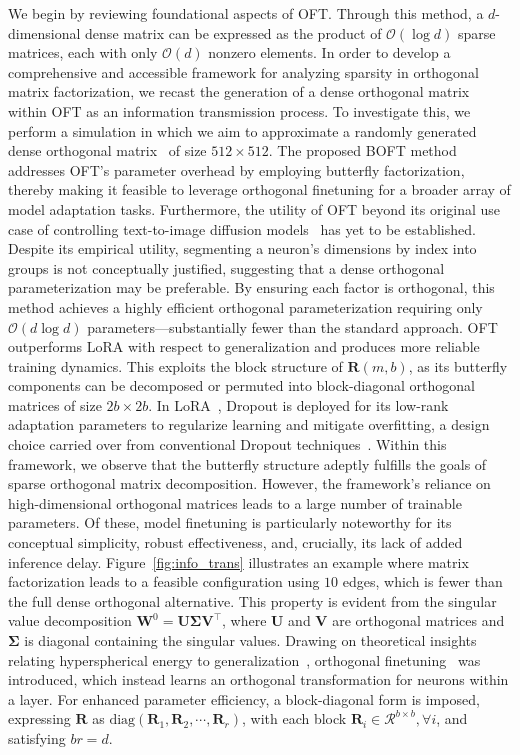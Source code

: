 \begin{itemize}[leftmargin=*,nosep]
\begin{theorem}
We begin by reviewing foundational aspects of OFT. Through this method, a $d$-dimensional dense matrix can be expressed as the product of $\mathcal{O}(\log d)$ sparse matrices, each with only $\mathcal{O}(d)$ nonzero elements. In order to develop a comprehensive and accessible framework for analyzing sparsity in orthogonal matrix factorization, we recast the generation of a dense orthogonal matrix within OFT as an information transmission process. To investigate this, we perform a simulation in which we aim to approximate a randomly generated dense orthogonal matrix~\cite{anderson1987generation} of size $512\times 512$. The proposed BOFT method addresses OFT’s parameter overhead by employing butterfly factorization, thereby making it feasible to leverage orthogonal finetuning for a broader array of model adaptation tasks. Furthermore, the utility of OFT beyond its original use case of controlling text-to-image diffusion models~\cite{qiu2023controlling} has yet to be established. Despite its empirical utility, segmenting a neuron's dimensions by index into groups is not conceptually justified, suggesting that a dense orthogonal parameterization may be preferable. By ensuring each factor is orthogonal, this method achieves a highly efficient orthogonal parameterization requiring only $\mathcal{O}(d\log d)$ parameters—substantially fewer than the standard approach. OFT outperforms LoRA with respect to generalization and produces more reliable training dynamics. This exploits the block structure of $\bm{R}(m, b)$, as its butterfly components can be decomposed or permuted into block-diagonal orthogonal matrices of size $2b \times 2b$. In LoRA~\cite{hulora2022}, Dropout is deployed for its low-rank adaptation parameters to regularize learning and mitigate overfitting, a design choice carried over from conventional Dropout techniques~\cite{srivastava2014dropout}. Within this framework, we observe that the butterfly structure adeptly fulfills the goals of sparse orthogonal matrix decomposition. However, the framework’s reliance on high-dimensional orthogonal matrices leads to a large number of trainable parameters. Of these, model finetuning is particularly noteworthy for its conceptual simplicity, robust effectiveness, and, crucially, its lack of added inference delay. Figure~\ref{fig:info_trans} illustrates an example where matrix factorization leads to a feasible configuration using $10$ edges, which is fewer than the full dense orthogonal alternative. This property is evident from the singular value decomposition $\bm{W}^0 = \bm{U} \bm{\Sigma} \bm{V}^\top$, where $\bm{U}$ and $\bm{V}$ are orthogonal matrices and $\bm{\Sigma}$ is diagonal containing the singular values. Drawing on theoretical insights relating hyperspherical energy to generalization~\cite{liu2018learning,liu2021orthogonal}, orthogonal finetuning~\cite{qiu2023controlling} was introduced, which instead learns an orthogonal transformation for neurons within a layer. For enhanced parameter efficiency, a block-diagonal form is imposed, expressing $\bm{R}$ as $\text{diag}(\bm{R}_1,\bm{R}_2,\cdots,\bm{R}_r)$, with each block $\bm{R}_i\in\mathcal{R}^{b\times b},\forall i$, and satisfying $br=d$. 

\end{theorem}
\end{itemize}

